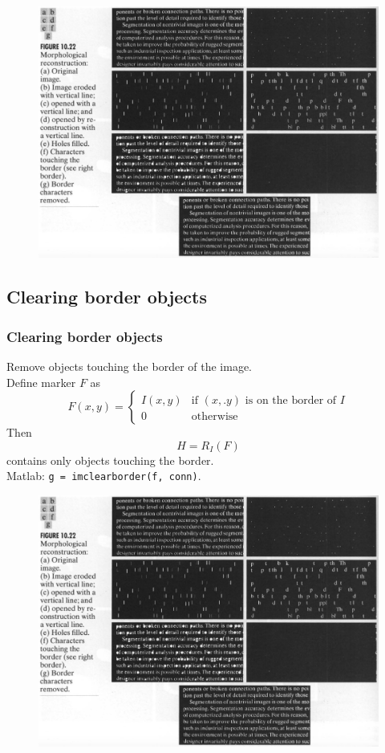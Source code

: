 \begin{frame}
\begin{figure}[!h]
\includegraphics[width=.75\textwidth]{fig-10-22-all}
\end{figure}
\end{frame}

\subsection{Clearing border objects}

\begin{frame}
\frametitle{Clearing border objects}
Remove objects touching the border of the image.\\
Define marker $F$ as
\[
F(x,y) = \left \{
\begin{array}{ll}
I(x,y) & \text{if }(x, .y)\text{ is on the border of }I\\
0 & \text{otherwise}
\end{array}
\right .
\]
Then
\[
H = R_{I}(F)
\]
contains only objects touching the border.\\
Matlab: \texttt{g = imclearborder(f, conn)}.
\end{frame}

\begin{frame}
\begin{figure}[!h]
\includegraphics[width=.75\textwidth]{fig-10-22-all}
\end{figure}
\end{frame}

